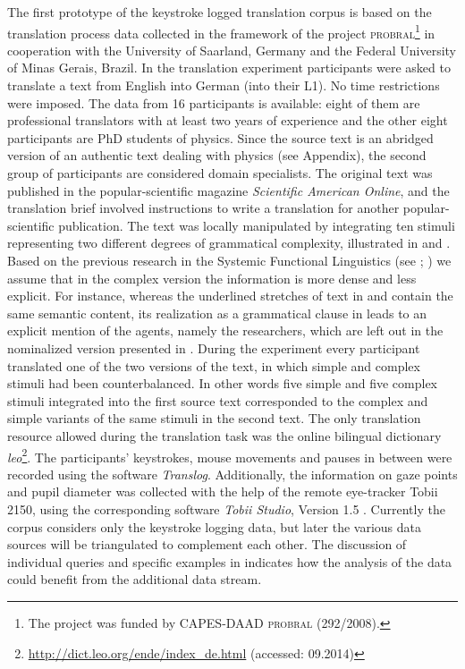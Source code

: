 \documentclass[output=paper]{LSP/langsci}
\begin{document}
The first prototype of the keystroke logged translation corpus is based on the translation process data collected in the framework of the project \textsc{probral}\footnote{The project was funded by CAPES-DAAD \textsc{probral} (292/2008).} in cooperation with the University of Saarland, Germany and the Federal University of Minas Gerais, Brazil. In the translation experiment participants were asked to translate a text from English into German (into their L1). No time restrictions were imposed. The data from 16 participants is available: eight of them are professional translators with at least two years of experience and the other eight participants are PhD students of physics. Since the source text is an abridged version of an authentic text dealing with physics (see Appendix), the second group of participants are considered domain specialists. The original text was published in the popular-scientific magazine \textit{Scientific American Online}, and the translation brief involved instructions to write a translation for another popular-scientific publication. The text was locally manipulated by integrating ten stimuli representing two different degrees of grammatical complexity, illustrated in  and . Based on the previous research in the Systemic Functional Linguistics (see \citealt[715]{Halliday2014}; \citealt[8-10]{Taverniers2003}) we assume that in the complex version the information is more dense and less explicit. For instance, whereas the underlined stretches of text in  and  contain the same semantic content, its realization as a grammatical clause in  leads to an explicit mention of the agents, namely the researchers, which are left out in the nominalized version presented in . During the experiment every participant translated one of the two versions of the text, in which simple and complex stimuli had been counterbalanced. In other words five simple and five complex stimuli integrated into the first source text corresponded to the complex and simple variants of the same stimuli in the second text. The only translation resource allowed during the translation task was the online bilingual dictionary \textit{leo}\footnote{\url{http://dict.leo.org/ende/index_de.html} (accessed: 09.2014)}. The participants’ keystrokes, mouse movements and pauses in between were recorded using the software \textit{Translog}. Additionally, the information on gaze points and pupil diameter was collected with the help of the remote eye-tracker Tobii 2150, using the corresponding software \textit{Tobii Studio}, Version 1.5 \citep{Tobii2008}. Currently the corpus considers only the keystroke logging data, but later the various data sources will be triangulated \citep[see][]{Alves2003} to complement each other. The discussion of individual queries and specific examples in  indicates how the analysis of the data could benefit from the additional data stream. 
\end{document}

